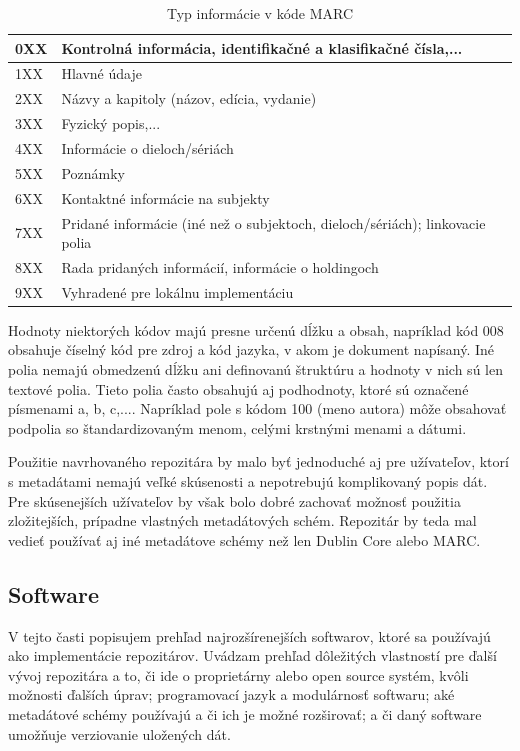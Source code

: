 \documentclass[thesis=M,slovak]{FITthesis}[2013/05/06]
\begin{document}
\begin{table}[!htbp]\centering
 	\caption[MARC]{Typ informácie v kóde MARC}\label{tab:marc}
\begin{tabularx}{\textwidth}{|l|X|} \hline
0XX	& Kontrolná informácia, identifikačné a klasifikačné čísla,... \\ \hline
1XX	& Hlavné údaje \\ \hline
2XX	& Názvy a kapitoly (názov, edícia, vydanie) \\ \hline
3XX	& Fyzický popis,... \\ \hline
4XX	& Informácie o dieloch/sériách \\ \hline
5XX	& Poznámky \\ \hline
6XX	& Kontaktné informácie na subjekty \\ \hline
7XX	& Pridané informácie (iné než o subjektoch, dieloch/sériách); linkovacie polia \\ \hline
8XX	& Rada pridaných informácií, informácie o holdingoch \\ \hline
9XX	& Vyhradené pre lokálnu implementáciu \\ \hline
\end{tabularx}
\end{table}

Hodnoty niektorých kódov majú presne určenú dĺžku a obsah, napríklad kód 008 obsahuje číselný kód pre zdroj a kód jazyka, v akom je dokument napísaný. Iné polia nemajú obmedzenú dĺžku ani definovanú štruktúru a hodnoty v nich sú len textové polia. Tieto polia často obsahujú aj podhodnoty, ktoré sú označené písmenami a, b, c,.... Napríklad pole s kódom 100 (meno autora) môže obsahovať podpolia so štandardizovaným menom, celými krstnými menami a dátumi.\cite[s.~288-291]{witten2009build}

Použitie navrhovaného repozitára by malo byť jednoduché aj pre užívateľov, ktorí s metadátami nemajú veľké skúsenosti a nepotrebujú komplikovaný popis dát. Pre skúsenejších užívateľov by však bolo dobré zachovať možnosť použitia zložitejších, prípadne vlastných metadátových schém. Repozitár by teda mal vedieť používať aj iné metadátove schémy než len Dublin Core alebo MARC.

\subsection{Software}
V tejto časti popisujem prehľad najrozšírenejších softwarov, ktoré sa používajú ako implementácie repozitárov. Uvádzam prehľad dôležitých vlastností pre ďalší vývoj repozitára a to, či ide o proprietárny alebo open source systém, kvôli možnosti ďalších úprav; programovací jazyk a modulárnosť softwaru; aké metadátové schémy používajú a či ich je možné rozširovať; a či daný software umožňuje verziovanie uložených dát.
\end{document}
